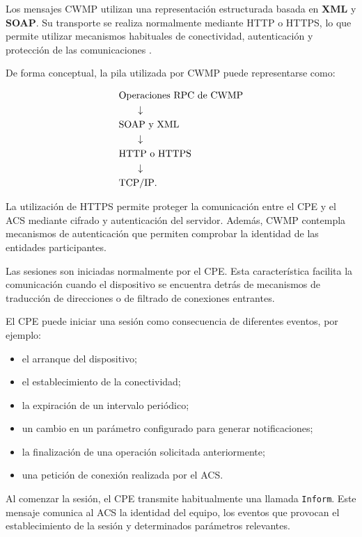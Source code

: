 Los mensajes CWMP utilizan una representación estructurada basada en
\textbf{XML} y \textbf{SOAP}. Su transporte se realiza normalmente
mediante HTTP o HTTPS, lo que permite utilizar mecanismos habituales de
conectividad, autenticación y protección de las comunicaciones
\cite{bbf_tr069}.

De forma conceptual, la pila utilizada por CWMP puede representarse como:

\[
\begin{aligned}
    &\text{Operaciones RPC de CWMP}\\
    &\hspace{0.6cm}\downarrow\\
    &\text{SOAP y XML}\\
    &\hspace{0.6cm}\downarrow\\
    &\text{HTTP o HTTPS}\\
    &\hspace{0.6cm}\downarrow\\
    &\text{TCP/IP}.
\end{aligned}
\]

La utilización de HTTPS permite proteger la comunicación entre el CPE y
el ACS mediante cifrado y autenticación del servidor. Además, CWMP
contempla mecanismos de autenticación que permiten comprobar la identidad
de las entidades participantes.

Las sesiones son iniciadas normalmente por el CPE. Esta característica
facilita la comunicación cuando el dispositivo se encuentra detrás de
mecanismos de traducción de direcciones o de filtrado de conexiones
entrantes.

El CPE puede iniciar una sesión como consecuencia de diferentes eventos,
por ejemplo:

\begin{itemize}
    \item el arranque del dispositivo;
    \item el establecimiento de la conectividad;
    \item la expiración de un intervalo periódico;
    \item un cambio en un parámetro configurado para generar
    notificaciones;
    \item la finalización de una operación solicitada anteriormente;
    \item una petición de conexión realizada por el ACS.
\end{itemize}

Al comenzar la sesión, el CPE transmite habitualmente una llamada
\texttt{Inform}. Este mensaje comunica al ACS la identidad del equipo,
los eventos que provocan el establecimiento de la sesión y determinados
parámetros relevantes.

